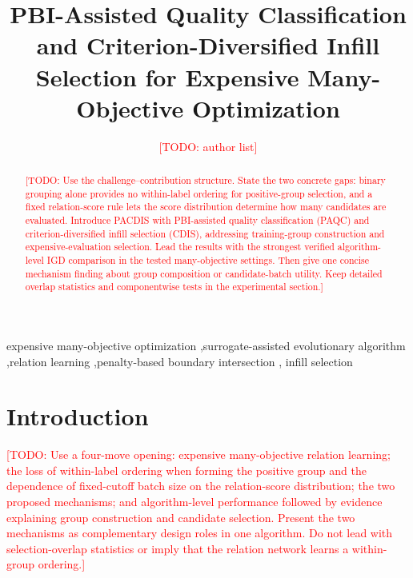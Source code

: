 \documentclass[final,5p,times,twocolumn]{elsarticle}
\newcommand{\TODO}[1]{\textcolor{red}{[TODO: #1]}}
\begin{document}
\begin{frontmatter}

\title{PBI-Assisted Quality Classification and Criterion-Diversified Infill Selection
for Expensive Many-Objective Optimization}

\author{\TODO{author list}}


\begin{abstract}
\TODO{Use the challenge--contribution structure. State the two concrete gaps:
binary grouping alone provides no within-label ordering for positive-group selection,
and a fixed relation-score rule lets the score distribution determine how many
candidates are evaluated. Introduce PACDIS with PBI-assisted quality classification (PAQC) and
criterion-diversified infill selection (CDIS), addressing
training-group construction and expensive-evaluation selection. Lead the results
with the strongest verified algorithm-level IGD comparison in the tested
many-objective settings. Then give one concise mechanism finding about group
composition or candidate-batch utility. Keep detailed overlap statistics and
componentwise tests in the experimental section.}
\end{abstract}

\begin{keyword}
expensive many-objective optimization \sep surrogate-assisted evolutionary
algorithm \sep relation learning \sep penalty-based boundary intersection \sep
infill selection
\end{keyword}

\end{frontmatter}

\section{Introduction}
\label{sec:intro}

\TODO{Use a four-move opening: expensive many-objective relation learning; the
loss of within-label ordering when forming the positive group and the dependence of
fixed-cutoff batch size on the relation-score distribution; the two proposed
mechanisms; and algorithm-level performance followed by evidence explaining
group construction and candidate selection. Present the two mechanisms as
complementary design roles in one algorithm. Do not lead with selection-overlap
statistics or imply that the relation network learns a within-group ordering.}
\end{document}
